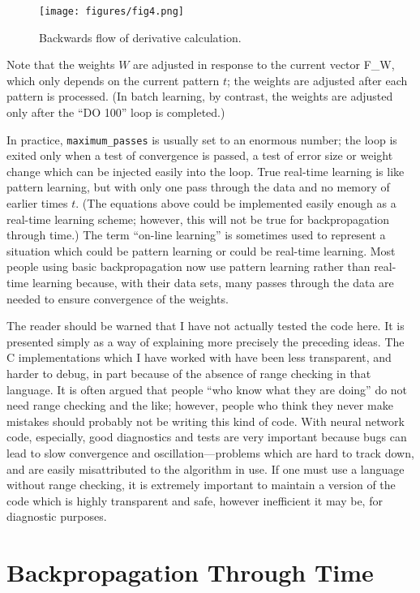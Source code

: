 \documentclass[journal]{IEEEtran} %
\begin{document}
\begin{figure}[htb]
    \centering
    \texttt{[image: figures/fig4.png]} %
    \caption{Backwards flow of derivative calculation.}
    \label{fig:backward_flow}
\end{figure}

Note that the weights $W$ are adjusted in response to the current vector F\_W, which only depends on the current pattern $t$; the weights are adjusted after each pattern is processed. (In batch learning, by contrast, the weights are adjusted only after the ``DO 100'' loop is completed.)

In practice, \texttt{maximum\_passes} is usually set to an enormous number; the loop is exited only when a test of convergence is passed, a test of error size or weight change which can be injected easily into the loop. True real-time learning is like pattern learning, but with only one pass through the data and no memory of earlier times $t$. (The equations above could be implemented easily enough as a real-time learning scheme; however, this will not be true for backpropagation through time.) The term ``on-line learning'' is sometimes used to represent a situation which could be pattern learning or could be real-time learning. Most people using basic backpropagation now use pattern learning rather than real-time learning because, with their data sets, many passes through the data are needed to ensure convergence of the weights.

The reader should be warned that I have not actually tested the code here. It is presented simply as a way of explaining more precisely the preceding ideas. The C implementations which I have worked with have been less transparent, and harder to debug, in part because of the absence of range checking in that language. It is often argued that people ``who know what they are doing'' do not need range checking and the like; however, people who think they never make mistakes should probably not be writing this kind of code. With neural network code, especially, good diagnostics and tests are very important because bugs can lead to slow convergence and oscillation---problems which are hard to track down, and are easily misattributed to the algorithm in use. If one must use a language without range checking, it is extremely important to maintain a version of the code which is highly transparent and safe, however inefficient it may be, for diagnostic purposes.

\section{Backpropagation Through Time}
\label{sec:bptt}
\end{document}
